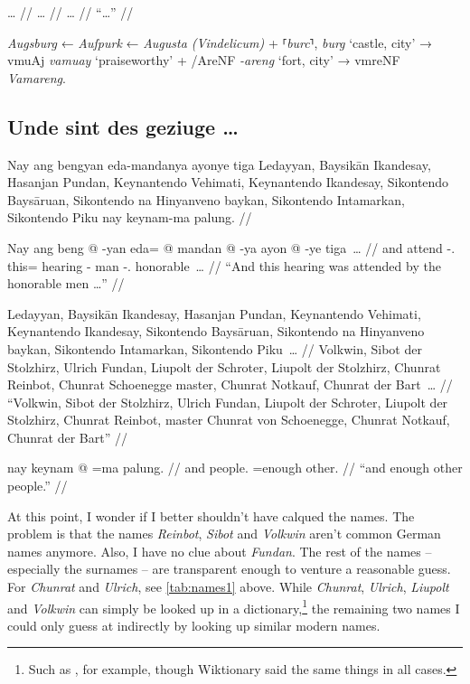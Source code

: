 \documentclass[12pt,paper=a4]{scrartcl}
\newcommand{\fw}[1]{\textit{#1}} %
\newcommand{\norm}[1]{⸢\textit{#1}⸣} %
\newcommand{\ayr}[1]{{\Tagati #1}}
\newcommand{\xayr}[3]{{\Tagati #1} \emph{#2} \enquote*{#3}}
\begin{document}
\ex \begingl
	\glpreamble … //
	\gla … //
	\glb … //
	\glft \enquote{…} //
\endgl \xe

\Nhg{} \fw{Augsburg} ← \Mhg{} \fw{Auſpurk} ← \Lat{} \fw{Augusta (Vindelicum)} + 
\Mhg{} \norm{burc}, \Ohg{} \fw{burg} `castle, city' → \Ayr{} 
\xayr{vmuAj}{vamuay}{praiseworthy} + \xayr{/AreNF}{-areng}{fort, city} → 
\ayr{vmreNF} \fw{Vamareng}.

\subsection*{Unde sint des geziuge …}


\pex 
	\glpreamble Nay ang bengyan eda-mandanya ayonye tiga Ledayyan, Baysikān 
		Ikandesay, Hasanjan Pundan, Keynantendo Vehimati, Keynantendo 
		Ikandesay, Sikontendo Baysāruan, Sikontendo na Hinyanveno 
		baykan, Sikontendo Intamarkan, Sikontendo Piku nay keynam-ma 
		palung. //
	
	\a \begingl
		\gla Nay ang beng @ -yan eda= @ mandan @ -ya ayon @ -ye tiga~… //
		\glb and \AgtT{} attend -\Tpl{}.\M{} this= hearing -\Loc{} man 
			-\Pl{}.\Top{} honorable~… //
		\glft \enquote{And this hearing was attended by the honorable men 
			…} //
	\endgl
	
	\a \begingl
		\gla Ledayyan, Baysikān Ikandesay, Hasanjan Pundan, Keynantendo 
			Vehimati, Keynantendo Ikandesay, Sikontendo Baysāruan, 
			Sikontendo na Hinyanveno baykan, Sikontendo Intamarkan, 
			Sikontendo Piku~… //
		\glb Volkwin, Sibot {der Stolzhirz}, Ulrich Fundan, Liupolt 
			{der Schroter}, Liupolt {der Stolzhirz}, Chunrat 
			Reinbot, Chunrat \Gen{} Schoenegge master, Chunrat 
			Notkauf, Chunrat {der Bart}~… //
		\glft \enquote{Volkwin, Sibot der Stolzhirz, Ulrich Fundan, 
			Liupolt der Schroter, Liupolt der Stolzhirz, Chunrat 
			Reinbot, master Chunrat von Schoenegge, Chunrat Notkauf, 
			Chunrat der Bart} //
	\endgl
	
	\a \begingl
		\gla nay keynam @ =ma palung. //
		\glb and people.\Top{} =enough other. //
		\glft \enquote{and enough other people.} //
	\endgl
\xe

At this point, I wonder if I better shouldn't have calqued the names. The 
problem is that the names \fw{Reinbot}, \fw{Sibot} and \fw{Volkwin} aren't 
common German names anymore. Also, I have no clue about \fw{Fundan}. The rest of 
the names -- especially the surnames -- are transparent enough to venture a 
reasonable guess. For \fw{Chunrat} and \fw{Ulrich}, see \autoref{tab:names1} 
above. While \fw{Chunrat}, \fw{Ulrich}, \fw{Liupolt} and \fw{Volkwin} can simply 
be looked up in a dictionary,\footnote{Such as \textcite{duden:vornamen}, for 
example, though Wiktionary said the same things in all cases.} the remaining two 
names I could only guess at indirectly by looking up similar modern names.
\end{document}
